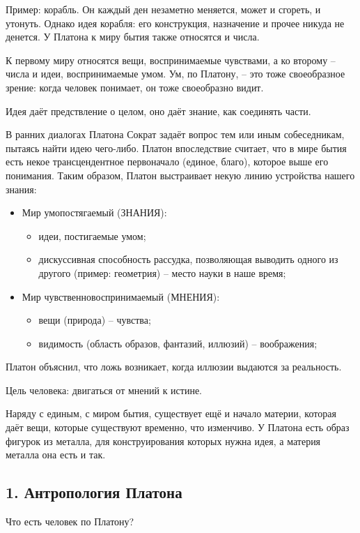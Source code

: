 \documentclass[a4paper, 12pt]{book} %
\begin{document}
Пример: корабль. Он каждый ден незаметно меняется, может и сгореть, и утонуть. Однако идея корабля: его конструкция, назначение и прочее никуда не денется.    
У Платона к миру бытия также относятся и числа.

К первому миру относятся вещи, воспринимаемые чувствами, а ко второму -- числа и идеи, воспринимаемые умом. Ум, по Платону, -- это тоже своеобразное зрение: когда человек понимает, он тоже своеобразно видит. 

Идея даёт предствление о целом, оно даёт знание, как соединять части.

В ранних диалогах Платона Сократ задаёт вопрос тем или иным собеседникам, пытаясь найти идею чего-либо. Платон впоследствие считает, что в мире бытия есть некое трансцендентное первоначало (единое, благо), которое выше его понимания. Таким образом, Платон выстраивает некую линию устройства нашего знания:

\begin{itemize}
\item Мир умопостягаемый (ЗНАНИЯ):
\begin{itemize}
\item идеи, постигаемые умом;
\item дискуссивная способность рассудка, позволяющая выводить одного из другого (пример: геометрия) -- место науки в наше время;
\end{itemize}
\item Мир чувственновоспринимаемый (МНЕНИЯ):
\begin{itemize}
\item вещи (природа) -- чувства;
\item видимость (область образов, фантазий, иллюзий) -- воображения;
\end{itemize}
\end{itemize}

Платон объяснил, что ложь возникает, когда иллюзии выдаются за реальность.

Цель человека: двигаться от мнений к истине.

Наряду с единым, с миром бытия, существует ещё и начало материи, которая даёт вещи, которые существуют временно, что изменчиво. У Платона есть образ фигурок из металла, для конструирования которых нужна идея, а материя металла она есть и так.

\subsection*{1. Антропология Платона}
Что есть человек по Платону?
\end{document}
